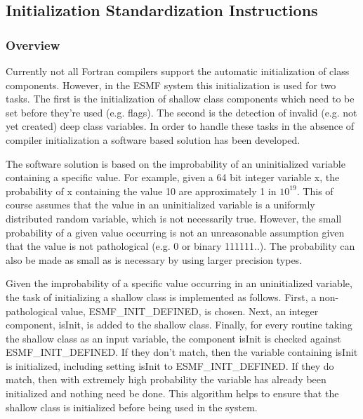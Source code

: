 

\subsection{Initialization Standardization Instructions}

\subsubsection{Overview}

Currently not all Fortran compilers support the
automatic initialization of class components. However,
in the ESMF system this initialization is used for two
tasks. The first is the initialization of shallow class
components which need to be set before they're used
(e.g. flags). The second is the detection of invalid
(e.g. not yet created) deep class variables. In order
to handle these tasks in the absence of compiler
initialization a software based solution has been
developed.

 The software solution is based on the improbability of
an uninitialized variable containing a specific value. For
example, given a 64 bit integer variable x, the
probability of x containing the value 10 are approximately
1 in $10^{19}$. This of course assumes that the value in
an uninitialized variable is a uniformly distributed random
variable, which is not necessarily true. However, the small probability
of a given value occurring is not an unreasonable assumption
given that the value is not pathological
(e.g. 0 or binary 111111..). The probability can
also be made as small as is necessary
by using larger precision types.

 Given the improbability of a specific value occurring in an
uninitialized variable, the task of initializing a shallow
class is implemented as follows. First, a non-pathological
value, ESMF\_INIT\_DEFINED, is chosen. Next, an integer
component, isInit, is added to the shallow class.
Finally, for every routine taking the shallow
class as an input variable, the component isInit is checked
against ESMF\_INIT\_DEFINED. If they don't match, then the variable
containing isInit is initialized, including setting isInit to
ESMF\_INIT\_DEFINED. If they do match, then with extremely high probability
the variable has already been initialized and nothing
need be done. This algorithm helps to ensure that the shallow
class is initialized before being used in the system.

